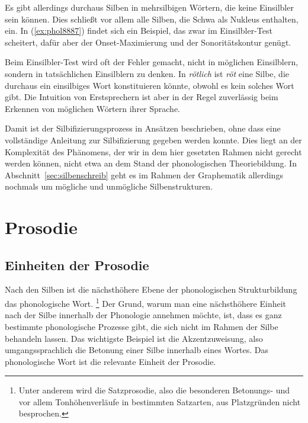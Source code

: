 Es gibt allerdings durchaus Silben in mehrsilbigen Wörtern, die keine Einsilbler sein können.
Dies schließt vor allem alle Silben, die Schwa als Nukleus enthalten, ein.
In (\ref{ex:phol8887}) findet sich ein Beispiel, das zwar im Einsilbler-Test scheitert, dafür aber der Onset-Maximierung und der Sonoritätskontur genügt.

\begin{exe}
\end{exe}

Beim Einsilbler-Test wird oft der Fehler gemacht, nicht in möglichen Einsilblern, sondern in tatsächlichen Einsilblern zu denken.
In \textit{rötlich} ist \textit{röt} eine Silbe, die durchaus ein einsilbiges Wort konstituieren könnte, obwohl es kein solches Wort gibt.
Die Intuition von Erstsprechern ist aber in der Regel zuverlässig beim Erkennen von möglichen Wörtern ihrer Sprache.

Damit ist der Silbifizierungsprozess in Ansätzen beschrieben, ohne dass eine vollständige Anleitung zur Silbifizierung gegeben werden konnte.
Dies liegt an der Komplexität des Phänomens, der wir in dem hier gesetzten Rahmen nicht gerecht werden können, nicht etwa an dem Stand der phonologischen Theoriebildung.
In Abschnitt~\ref{sec:silbenschreib} geht es im Rahmen der Graphematik allerdings nochmals um mögliche und unmögliche Silbenstrukturen.

\section{Prosodie}

\label{sec:prosodie}


\subsection{Einheiten der Prosodie}

Nach den Silben ist die nächsthöhere Ebene der phonologischen Strukturbildung das phonologische Wort.%
\footnote{Unter anderem wird die Satzprosodie, also die besonderen Betonungs- und vor allem Tonhöhenverläufe in bestimmten Satzarten, aus Platzgründen nicht besprochen.}
Der Grund, warum man eine nächsthöhere Einheit nach der Silbe innerhalb der Phonologie annehmen möchte, ist, dass es ganz bestimmte phonologische Prozesse gibt, die sich nicht im Rahmen der Silbe behandeln lassen.
Das wichtigste Beispiel ist die Akzentzuweisung, also umgangssprachlich die Betonung einer Silbe innerhalb eines Wortes.
Das phonologische Wort ist die relevante Einheit der Prosodie.

